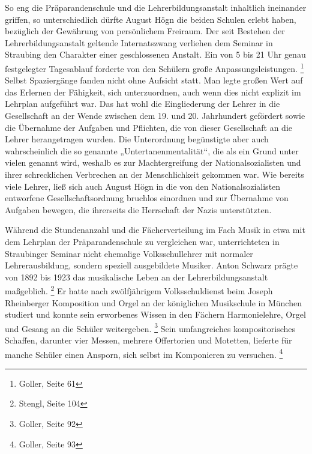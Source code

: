 \documentclass[a4paper]{article}
\begin{document}
So eng die Präparandenschule und die Lehrerbildungsanstalt inhaltlich
ineinander griffen, so unterschiedlich dürfte August Högn die beiden
Schulen erlebt haben, bezüglich der Gewährung von persönlichem
Freiraum. Der seit Bestehen der Lehrerbildungsanstalt geltende
Internatszwang verliehen dem Seminar in Straubing den Charakter einer
geschlossenen Anstalt. Ein von 5 bis 21 Uhr genau festgelegter
Tagesablauf forderte von den Schülern große
Anpassungsleistungen. \footnote{Goller, Seite 61} Selbst Spaziergänge
fanden nicht ohne Aufsicht statt. Man legte großen Wert auf das
Erlernen der Fähigkeit, sich unterzuordnen, auch wenn dies nicht
explizit im Lehrplan aufgeführt war. Das hat wohl die Eingliederung der
Lehrer in die Gesellschaft an der Wende zwischen dem 19. und 20.
Jahrhundert gefördert sowie die Übernahme der Aufgaben und Pflichten,
die von dieser Gesellschaft an die Lehrer herangetragen wurden. Die
Unterordnung begünstigte aber auch wahrscheinlich die so genannte
„Untertanenmentalität“, die als ein Grund unter vielen genannt wird,
weshalb es zur Machtergreifung der Nationalsozialisten und ihrer
schrecklichen Verbrechen an der Menschlichkeit gekommen war. Wie
bereits viele Lehrer, ließ sich auch August Högn in die von den
Nationalsozialisten entworfene Gesellschaftsordnung bruchlos einordnen
und zur Übernahme von Aufgaben bewegen, die ihrerseits die Herrschaft
der Nazis unterstützten.

Während die Stundenanzahl und die Fächerverteilung im Fach Musik in etwa
mit dem Lehrplan der Präparandenschule zu vergleichen war,
unterrichteten in Straubinger Seminar nicht ehemalige Volksschullehrer
mit normaler Lehrerausbildung, sondern speziell ausgebildete Musiker.
Anton Schwarz prägte von 1892 bis 1923 das musikalische Leben an der
Lehrerbildungsanstalt maßgeblich. \footnote{Stengl, Seite 104} Er hatte
nach zwölfjährigem Volksschuldienst beim Joseph Rheinberger Komposition
und Orgel an der königlichen Musikschule in München studiert und konnte
sein erworbenes Wissen in den Fächern Harmonielehre, Orgel und Gesang
an die Schüler weitergeben. \footnote{Goller, Seite 92} Sein
umfangreiches kompositorisches Schaffen, darunter vier Messen, mehrere
Offertorien und Motetten, lieferte für manche Schüler einen Ansporn,
sich selbst im Komponieren zu versuchen. \footnote{Goller, Seite 93}
\end{document}
